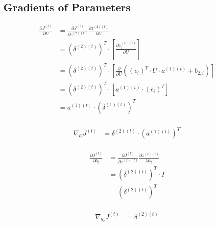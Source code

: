 \documentclass{article}
\begin{document}
	\subsection{Gradients of Parameters}
	\begin{equation}
	\begin{aligned}
		\frac{\partial J^{(t)}}{\partial U} &= \frac{\partial J^{(t)}}{\partial z^{(2)(t)}} 
		\frac{\partial z^{(2)(t)}}{\partial U} \\
		&= (\delta^{(2)(t)})^T \cdot \left[\frac{\partial z^{(2)(t)}_i}{\partial U}\right]\\
		&= (\delta^{(2)(t)})^T \cdot \left[\frac{\partial }{\partial U} ((\epsilon_i)^T \cdot U \cdot a^{(1)(t)} + b_{2,i})\right]\\
		&= (\delta^{(2)(t)})^T \cdot \left[a^{(1)(t)} \cdot (\epsilon_i)^T\right]\\	
		&= a^{(1)(t)} \cdot (\delta^{(1)(t)})^T\\
	\end{aligned}
	\end{equation}
	
	\begin{equation}
	\begin{aligned}
		\nabla_U J^{(t)} &= \delta^{(2)(t)} \cdot (a^{(1)(t)})^T\\
	\end{aligned}
	\end{equation}
	
	\begin{equation}
	\begin{aligned}
		\frac{\partial J^{(t)}}{\partial b_2} &= \frac{\partial J^{(t)}}{\partial z^{(2)(t)}} 
		\frac{\partial z^{(2)(t)}}{\partial b_2} \\
		&= (\delta^{(2)(t)})^T \cdot I \\
		&= (\delta^{(2)(t)})^T \\
	\end{aligned}
	\end{equation}
	
	\begin{equation}
	\begin{aligned}
		\nabla_{b_2} J^{(t)} &= \delta^{(2)(t)} \\
	\end{aligned}
	\end{equation}
	
\end{document}
